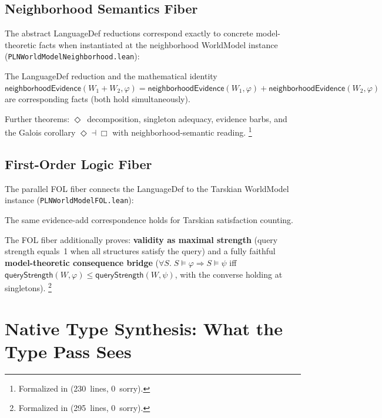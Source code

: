 \documentclass[11pt,openany]{report}
\begin{document}
\subsection{Neighborhood Semantics Fiber}

The abstract LanguageDef reductions correspond exactly to concrete
model-theoretic facts when instantiated at the neighborhood WorldModel
instance (\texttt{PLNWorldModelNeighborhood.lean}):

\begin{theorem}
The LanguageDef reduction and the mathematical identity
$\mathsf{neighborhoodEvidence}(W_1 + W_2, \varphi) =
\mathsf{neighborhoodEvidence}(W_1, \varphi) +
\mathsf{neighborhoodEvidence}(W_2, \varphi)$
are corresponding facts (both hold simultaneously).
\end{theorem}

\noindent
Further theorems: $\Diamond$~decomposition,
singleton adequacy, evidence barbs, and the Galois corollary
$\Diamond \dashv \Box$ with neighborhood-semantic reading.%
\footnote{Formalized in 
  (230~lines, 0~sorry).}

\subsection{First-Order Logic Fiber}

The parallel FOL fiber connects the LanguageDef to the Tarskian
WorldModel instance (\texttt{PLNWorldModelFOL.lean}):

\begin{theorem}
The same evidence-add correspondence holds for Tarskian satisfaction
counting.
\end{theorem}

\noindent
The FOL fiber additionally proves:
\textbf{validity as maximal strength} (query strength equals~1 when all
structures satisfy the query) and a fully faithful
\textbf{model-theoretic consequence bridge} ($\forall S.\; S \models \varphi
\Rightarrow S \models \psi$ iff
$\mathsf{queryStrength}(W, \varphi) \le \mathsf{queryStrength}(W, \psi)$,
with the converse holding at singletons).%
\footnote{Formalized in 
  (295~lines, 0~sorry).}

\section{Native Type Synthesis: What the Type Pass Sees}
\label{sec:wm-ntt-scope}
\end{document}
